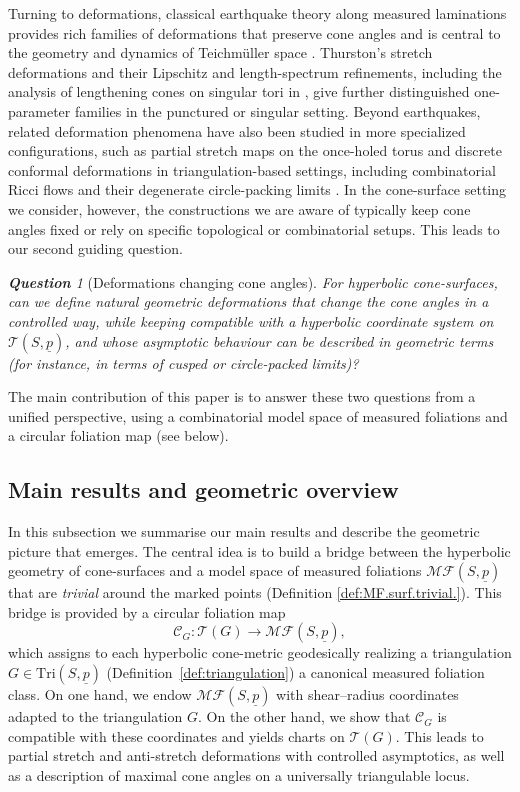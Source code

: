 \documentclass[11pt, letterpaper]{amsart}
\theoremstyle{definition}
\theoremstyle{remark}
\newtheorem{question}[theorem]{\rm\bf Question}
\newcommand{\up}{\underline{p}}
\newcommand{\Sp}{(S,\up)}
\newcommand{\TSp}{\text{Tri}\Sp}
\newcommand{\cMFp}{\mathcal{MF} (S,\up)}
\newcommand{\cCG}{\mathcal{C}_{G}}
\newcommand{\cT}{\mathcal{T}}
\newcommand{\cTp}{\mathcal{T} (S,\up)}
\numberwithin{equation}{section}
\begin{document}
Turning to deformations, classical earthquake theory along measured laminations provides rich families of deformations that preserve cone angles and is central to the geometry and dynamics of Teichm\"uller space \cite{Thu84, Ker83, BS09}.
Thurston's stretch deformations and their Lipschitz and length-spectrum refinements, including the analysis of lengthening cones on singular tori in \cite{Gue15}, give further distinguished one-parameter families in the punctured or singular setting.
Beyond earthquakes, related deformation phenomena have also been studied in more specialized configurations, such as partial stretch maps on the once-holed torus \cite{HP21} and discrete conformal deformations in triangulation-based settings, including combinatorial Ricci flows \cite{CL03,GLSW18} and their degenerate circle-packing limits \cite{HLTZZ25}. 
In the cone-surface setting we consider, however, the constructions we are aware of typically keep cone angles fixed or rely on specific topological or combinatorial setups.
This leads to our second guiding question.

\begin{question}[Deformations changing cone angles]
  \label{Q:deform.Teich.}
  \textit{For hyperbolic cone-surfaces, can we define natural geometric deformations that change the cone angles in a controlled way, while keeping compatible with a hyperbolic coordinate system on \(\cTp\), and whose asymptotic behaviour can be described in geometric terms (for instance, in terms of cusped or circle-packed limits)?}
\end{question}

The main contribution of this paper is to answer these two questions from a unified perspective, using a combinatorial model space of measured foliations and a circular foliation map (see below). 


\subsection{Main results and geometric overview}
\label{subsec:result}

In this subsection we summarise our main results and describe the geometric picture that emerges.
The central idea is to build a bridge between the hyperbolic geometry of cone-surfaces and a model space of measured foliations \(\cMFp\) that are {\em trivial} around the marked points (Definition \ref{def:MF.surf.trivial.}).
This bridge is provided by a circular foliation map
\[
  \cCG : \cT(G) \longrightarrow \cMFp,
\]
which assigns to each hyperbolic cone-metric geodesically realizing a triangulation \(G\in \TSp\) (Definition~\ref{def:triangulation}) a canonical measured foliation class.
On one hand, we endow \(\cMFp\) with shear--radius coordinates adapted to the triangulation \(G\).
On the other hand, we show that \(\cCG\) is compatible with these coordinates and yields charts on \(\cT(G)\).
This leads to partial stretch and anti-stretch deformations with controlled asymptotics, as well as a description of maximal cone angles on a universally triangulable locus.
\end{document}
